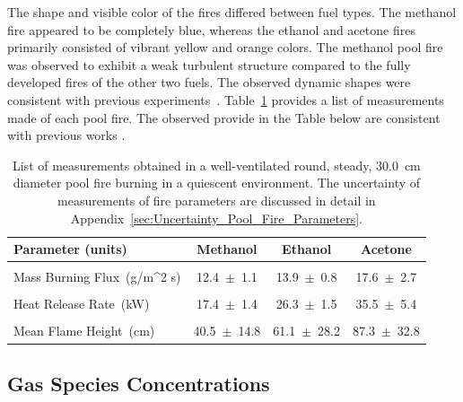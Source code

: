\documentclass[12pt]{article}
\begin{document}
The shape and visible color of the fires differed between fuel types. The methanol fire appeared to be completely blue, whereas the ethanol and acetone fires primarily consisted of vibrant yellow and orange colors. The methanol pool fire was observed to exhibit a weak turbulent structure compared to the fully developed fires of the other two fuels. The observed dynamic shapes were consistent with previous experiments~\cite{Hamins2016,Hamins1994,Hamins1991,Hamins1996,Lock2008}. Table~\ref{tab:Pool_Fire_Parameters_Table} provides a list of measurements made of each pool fire. The observed provide in the Table below are consistent with previous works \cite{Kim2019}. 

\begin{table}[!]
\caption{List of measurements obtained in a well-ventilated round, steady, 30.0~\si{cm} diameter pool fire burning in a quiescent environment. The uncertainty of measurements of fire parameters are discussed in detail in Appendix~\ref{sec:Uncertainty_Pool_Fire_Parameters}.}
\label{tab:Pool_Fire_Parameters_Table}
\centering
	\footnotesize
	\begin{tabular}{lccc}
\hline
\textbf{Parameter (units)} &\textbf{Methanol}& \textbf{Ethanol}& \textbf{Acetone}\\
\hline
\\[0.01cm]
Mass Burning Flux~(\si{g/{m^2 s}})		&	12.4~$\pm$~1.1		&	13.9~$\pm$~0.8	&	17.6~$\pm$~2.7\\
\\[0.01cm]
Heat Release Rate~(\si{kW})			&	17.4~$\pm$~1.4		&	26.3~$\pm$~1.5	&	35.5~$\pm$~5.4\\
\\[0.01cm]
Mean Flame Height~(\si{cm})			&	40.5~$\pm$~14.8		&	61.1~$\pm$~28.2	&	87.3~$\pm$~32.8\\
\hline
\end{tabular}
\end{table}




\subsection{Gas Species Concentrations}
\label{ssec:Gas_Species_Concentrations}
\end{document}
